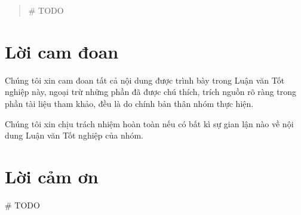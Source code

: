\begin{abstract}
	\# TODO
\end{abstract}
\clearpage

\chapter*{Lời cam đoan}
\thispagestyle{empty}
Chúng tôi xin cam đoan tất cả nội dung được trình bày trong Luận văn Tốt nghiệp này, ngoại trừ những phần đã được chú thích, trích nguồn rõ ràng trong phần tài liệu tham khảo, đều là do chính bản thân nhóm thực hiện.

Chúng tôi xin chịu trách nhiệm hoàn toàn nếu có bất kì sự gian lận nào về nội dung Luận văn Tốt nghiệp của nhóm.

\chapter*{Lời cảm ơn}
\thispagestyle{empty}

\# TODO